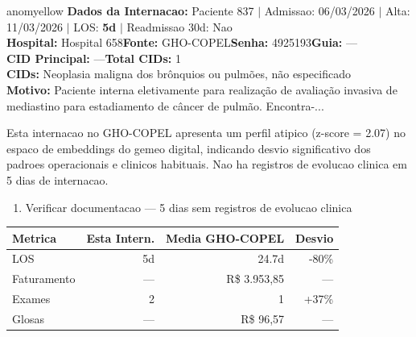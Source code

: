 \documentclass[a4paper,10pt]{article}
\begin{document}
\newpage

\begin{anomalycard}[Internacao 721 | GHO-COPEL | MODERADO (z=2.07)]{anomyellow}
\textbf{Dados da Internacao:} Paciente 837 $\mid$ Admissao: 06/03/2026 $\mid$ Alta: 11/03/2026 $\mid$ LOS: \textbf{5d} $\mid$ Readmissao 30d: Nao\\
\textbf{Hospital:} Hospital 658\quad\textbf{Fonte:} GHO-COPEL\quad\textbf{Senha:} 4925193\quad\textbf{Guia:} ---\\
\textbf{CID Principal:} {\small ---}\quad\textbf{Total CIDs:} 1\\

\textbf{CIDs:} {\scriptsize Neoplasia maligna dos brônquios ou pulmões, não especificado}\\

\textbf{Motivo:} {\scriptsize Paciente interna eletivamente para realização de avaliação invasiva de mediastino para estadiamento de câncer de pulmão. Encontra-...}\\

\vspace{2pt}\begin{tcolorbox}[colback=severityred!20,colframe=anomyellow,title={\textbf{Interpretacao de Negocio}},fonttitle=\bfseries\small,left=4pt,right=4pt,top=3pt,bottom=3pt]
{\small Esta internacao no GHO-COPEL apresenta um perfil atipico (z-score = 2.07) no espaco de embeddings do gemeo digital, indicando desvio significativo dos padroes operacionais e clinicos habituais. Nao ha registros de evolucao clinica em 5 dias de internacao.}
\end{tcolorbox}
\begin{tcolorbox}[colback=severityyellow!30,colframe=anomorange,title={\textbf{Recomendacoes Especificas}},fonttitle=\bfseries\small,left=4pt,right=4pt,top=3pt,bottom=3pt]
\begin{enumerate}[nosep,leftmargin=16pt]
\item {\small Verificar documentacao --- 5 dias sem registros de evolucao clinica}
\end{enumerate}
\end{tcolorbox}
\begin{center}\begin{tabular}{l r r r}\toprule\textbf{Metrica} & \textbf{Esta Intern.} & \textbf{Media GHO-COPEL} & \textbf{Desvio} \\\midrule
LOS & 5d & 24.7d & -80\% \\
Faturamento & --- & R\$ 3.953,85 & --- \\
Exames & 2 & 1 & +37\% \\
Glosas & --- & R\$ 96,57 & --- \\
\bottomrule\end{tabular}\end{center}


\end{anomalycard}
\end{document}
